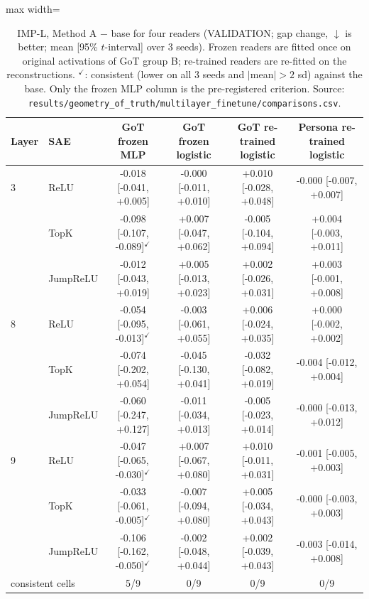 \begin{table}[t]
\centering
\small
\caption{IMP-L, Method A $-$ base for four readers (VALIDATION; gap change, $\downarrow$ is better; mean [95\% $t$-interval] over 3 seeds). Frozen readers are fitted once on original activations of GoT group B; re-trained readers are re-fitted on the reconstructions. $^\checkmark$: consistent (lower on all 3 seeds and $|$mean$|>2$ sd) against the base. Only the frozen MLP column is the pre-registered criterion. Source: \texttt{results/\allowbreak{}geometry\_of\_truth/\allowbreak{}multilayer\_finetune/\allowbreak{}comparisons.csv}.}
\label{tab:impl_readers}
\begin{adjustbox}{max width=\linewidth}
\begin{tabular}{llcccc}
\toprule
Layer & SAE & GoT frozen MLP & GoT frozen logistic & GoT re-trained logistic & Persona re-trained logistic \\
\midrule
3 & ReLU & -0.018 [-0.041, +0.005] & -0.000 [-0.011, +0.010] & +0.010 [-0.028, +0.048] & -0.000 [-0.007, +0.007] \\
 & TopK & -0.098 [-0.107, -0.089]$^\checkmark$ & +0.007 [-0.047, +0.062] & -0.005 [-0.104, +0.094] & +0.004 [-0.003, +0.011] \\
 & JumpReLU & -0.012 [-0.043, +0.019] & +0.005 [-0.013, +0.023] & +0.002 [-0.026, +0.031] & +0.003 [-0.001, +0.008] \\
\midrule
8 & ReLU & -0.054 [-0.095, -0.013]$^\checkmark$ & -0.003 [-0.061, +0.055] & +0.006 [-0.024, +0.035] & +0.000 [-0.002, +0.002] \\
 & TopK & -0.074 [-0.202, +0.054] & -0.045 [-0.130, +0.041] & -0.032 [-0.082, +0.019] & -0.004 [-0.012, +0.004] \\
 & JumpReLU & -0.060 [-0.247, +0.127] & -0.011 [-0.034, +0.013] & -0.005 [-0.023, +0.014] & -0.000 [-0.013, +0.012] \\
\midrule
9 & ReLU & -0.047 [-0.065, -0.030]$^\checkmark$ & +0.007 [-0.067, +0.080] & +0.010 [-0.011, +0.031] & -0.001 [-0.005, +0.003] \\
 & TopK & -0.033 [-0.061, -0.005]$^\checkmark$ & -0.007 [-0.094, +0.080] & +0.005 [-0.034, +0.043] & -0.000 [-0.003, +0.003] \\
 & JumpReLU & -0.106 [-0.162, -0.050]$^\checkmark$ & -0.002 [-0.048, +0.044] & +0.002 [-0.039, +0.043] & -0.003 [-0.014, +0.008] \\
\midrule
\multicolumn{2}{l}{consistent cells} & 5/9 & 0/9 & 0/9 & 0/9 \\
\bottomrule
\end{tabular}
\end{adjustbox}
\end{table}

